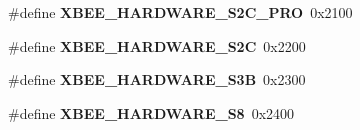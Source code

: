 \begin{DoxyCompactItemize}
\item 
\hypertarget{group__xbee__device_ga5b54a06757ceed4579394de8b630864d}{\#define {\bfseries X\-B\-E\-E\-\_\-\-H\-A\-R\-D\-W\-A\-R\-E\-\_\-\-S2\-C\-\_\-\-P\-R\-O}~0x2100}\label{group__xbee__device_ga5b54a06757ceed4579394de8b630864d}

\item 
\hypertarget{group__xbee__device_ga01dbbdc8a6feaee9a33b130c6daaef2e}{\#define {\bfseries X\-B\-E\-E\-\_\-\-H\-A\-R\-D\-W\-A\-R\-E\-\_\-\-S2\-C}~0x2200}\label{group__xbee__device_ga01dbbdc8a6feaee9a33b130c6daaef2e}

\item 
\hypertarget{group__xbee__device_gad5820f837dffbf253ffb2d2ce8b37578}{\#define {\bfseries X\-B\-E\-E\-\_\-\-H\-A\-R\-D\-W\-A\-R\-E\-\_\-\-S3\-B}~0x2300}\label{group__xbee__device_gad5820f837dffbf253ffb2d2ce8b37578}

\item 
\hypertarget{group__xbee__device_ga681b09d8416068ab9a9afedd303bfefa}{\#define {\bfseries X\-B\-E\-E\-\_\-\-H\-A\-R\-D\-W\-A\-R\-E\-\_\-\-S8}~0x2400}\label{group__xbee__device_ga681b09d8416068ab9a9afedd303bfefa}

\end{DoxyCompactItemize}
\label{_amgrp01747264fe7bf50731df0522c351974e}%
